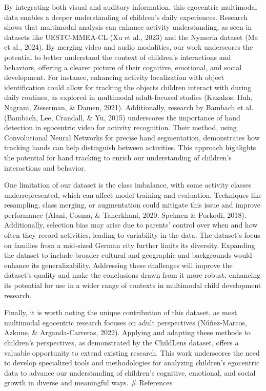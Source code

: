 \documentclass[
  man,floatsintext]{apa6}
\begin{document}
By integrating both visual and auditory information, this egocentric multimodal data enables a deeper understanding of children's daily experiences. Research shows that multimodal analysis can enhance activity understanding, as seen in datasets like UESTC-MMEA-CL (Xu et al., 2023) and the Nymeria dataset (Ma et al., 2024). By merging video and audio modalities, our work underscores the potential to better understand the context of children's interactions and behaviors, offering a clearer picture of their cognitive, emotional, and social development. For instance, enhancing activity localization with object identification could allow for tracking the objects children interact with during daily routines, as explored in multimodal adult-focused studies (Kazakos, Huh, Nagrani, Zisserman, \& Damen, 2021). Additionally, research by Bambach et al. (Bambach, Lee, Crandall, \& Yu, 2015) underscores the importance of hand detection in egocentric video for activity recognition. Their method, using Convolutional Neural Networks for precise hand segmentation, demonstrates how tracking hands can help distinguish between activities. This approach highlights the potential for hand tracking to enrich our understanding of children's interactions and behavior.

One limitation of our dataset is the class imbalance, with some activity classes underrepresented, which can affect model training and evaluation. Techniques like resampling, class merging, or augmentation could mitigate this issue and improve performance (Alani, Cosma, \& Taherkhani, 2020; Spelmen \& Porkodi, 2018). Additionally, selection bias may arise due to parents' control over when and how often they record activities, leading to variability in the data. The dataset's focus on families from a mid-sized German city further limits its diversity. Expanding the dataset to include broader cultural and geographic and backgrounds would enhance its generalizability. Addressing these challenges will improve the dataset's quality and make the conclusions drawn from it more robust, enhancing its potential for use in a wider range of contexts in multimodal child development research.

Finally, it is worth noting the unique contribution of this dataset, as most multimodal egocentric research focuses on adult perspectives (Núñez-Marcos, Azkune, \& Arganda-Carreras, 2022). Applying and adapting these methods to children's perspectives, as demonstrated by the ChildLens dataset, offers a valuable opportunity to extend existing research. This work underscores the need to develop specialized tools and methodologies for analyzing children's egocentric data to advance our understanding of children's cognitive, emotional, and social growth in diverse and meaningful ways.
\newpage
\# References
\end{document}
